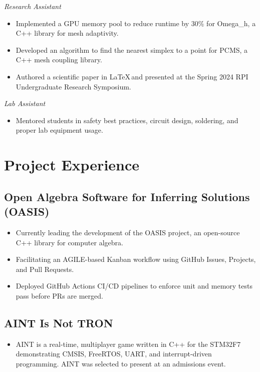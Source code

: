 \documentclass[11pt]{article}
\begin{document}
\textit{Research Assistant}
\begin{itemize}
    \item Implemented a GPU memory pool to reduce runtime by 30\% for Omega\_h, a C++ library for mesh adaptivity.
    \item Developed an algorithm to find the nearest simplex to a point for PCMS, a C++ mesh coupling library.
    \item Authored a scientific paper in \LaTeX\,and presented at the Spring 2024 RPI Undergraduate Research Symposium.
\end{itemize}

\textit{Lab Assistant}
\begin{itemize}
	\item Mentored students in safety best practices, circuit design, soldering, and proper lab equipment usage.
\end{itemize}

\section*{Project Experience}

\subsection*{Open Algebra Software for Inferring Solutions (OASIS)}
\begin{itemize}
	\item Currently leading the development of the OASIS project, an open-source C++ library for computer algebra.
	\item Facilitating an AGILE-based Kanban workflow using GitHub Issues, Projects, and Pull Requests.
	\item Deployed GitHub Actions CI/CD pipelines to enforce unit and memory tests pass before PRs are merged.
\end{itemize}

\subsection*{AINT Is Not TRON}
\begin{itemize}
    \item AINT is a real-time, multiplayer game written in C++ for the STM32F7 demonstrating CMSIS, FreeRTOS, UART, and interrupt-driven programming. AINT was selected to present at an admissions event.
\end{itemize}
\end{document}
